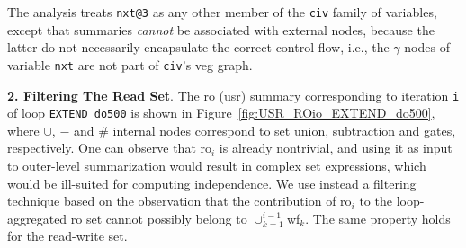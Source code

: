 \documentclass[10pt,nocopyrightspace]{sigplanconf}
\begin{document}
The analysis treats {\tt nxt@3} as any other member of the {\tt civ} family of 
variables, except that summaries {\em cannot} be associated with external nodes,
because the latter do not necessarily encapsulate the correct control flow,
i.e., the $\gamma$ nodes of variable {\tt nxt} are not part of {\tt civ}'s {\sc veg} graph.

\vspace{1ex}

{\bf 2. Filtering The Read Set}. The {\sc ro} ({\sc usr}) summary corresponding 
to iteration {\tt i} of loop {\tt EXTEND\_do500} is shown in 
Figure~\ref{fig:USR_ROio_EXTEND_do500}, where $\cup$, $-$ and $\#$ internal nodes 
correspond to set union, subtraction and gates, respectively.   
One can observe that {\sc ro}$_{i}$ is already nontrivial, and using it as
input to outer-level summarization would result in complex set expressions,
which would be ill-suited for computing independence.
%
We use instead a filtering technique based on the observation that
the contribution of {\sc ro}$_i$ to the loop-aggregated
{\sc ro} set cannot possibly belong to $\cup_{k=1}^{i-1}${\sc wf}$_k$.
The same property holds for the read-write set.
\end{document}
